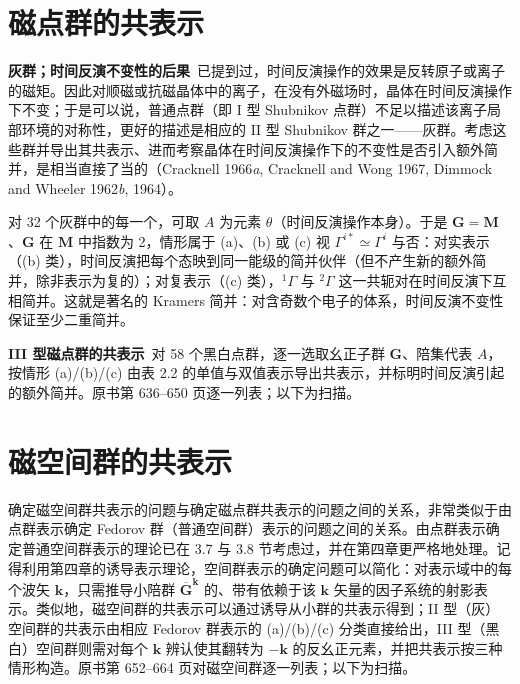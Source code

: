 \section{磁点群的共表示}

\noindent\textbf{灰群；时间反演不变性的后果}\ 已提到过，时间反演操作的效果是反转原子或离子的磁矩。因此对顺磁或抗磁晶体中的离子，在没有外磁场时，晶体在时间反演操作下不变；于是可以说，普通点群（即 I 型 Shubnikov 点群）不足以描述该离子局部环境的对称性，更好的描述是相应的 II 型 Shubnikov 群之一——灰群。考虑这些群并导出其共表示、进而考察晶体在时间反演操作下的不变性是否引入额外简并，是相当直接了当的（Cracknell 1966\textit{a}, Cracknell and Wong 1967, Dimmock and Wheeler 1962\textit{b}, 1964）。

对 32 个灰群中的每一个，可取 $A$ 为元素 $\theta$（时间反演操作本身）。于是 $\mathbf{G} = \mathbf{M}$、$\mathbf{G}$ 在 $\mathbf{M}$ 中指数为 2，情形属于 (a)、(b) 或 (c) 视 $\Gamma^{i*} \simeq \Gamma^{i}$ 与否：对实表示（(b) 类），时间反演把每个态映到同一能级的简并伙伴（但不产生新的额外简并，除非表示为复的）；对复表示（(c) 类），${}^{1}\Gamma$ 与 ${}^{2}\Gamma$ 这一共轭对在时间反演下互相简并。这就是著名的 Kramers 简并：对含奇数个电子的体系，时间反演不变性保证至少二重简并。

\noindent\textbf{III 型磁点群的共表示}\ 对 58 个黑白点群，逐一选取幺正子群 $\mathbf{G}$、陪集代表 $A$，按情形 (a)/(b)/(c) 由表 2.2 的单值与双值表示导出共表示，并标明时间反演引起的额外简并。原书第 636--650 页逐一列表；以下为扫描。



\section{磁空间群的共表示}

确定磁空间群共表示的问题与确定磁点群共表示的问题之间的关系，非常类似于由点群表示确定 Fedorov 群（普通空间群）表示的问题之间的关系。由点群表示确定普通空间群表示的理论已在 3.7 与 3.8 节考虑过，并在第四章更严格地处理。记得利用第四章的诱导表示理论，空间群表示的确定问题可以简化：对表示域中的每个波矢 $\mathbf{k}$，只需推导小陪群 $\overline{\mathbf{G}}^{\mathbf{k}}$ 的、带有依赖于该 $\mathbf{k}$ 矢量的因子系统的射影表示。类似地，磁空间群的共表示可以通过诱导从小群的共表示得到；II 型（灰）空间群的共表示由相应 Fedorov 群表示的 (a)/(b)/(c) 分类直接给出，III 型（黑白）空间群则需对每个 $\mathbf{k}$ 辨认使其翻转为 $-\mathbf{k}$ 的反幺正元素，并把共表示按三种情形构造。原书第 652--664 页对磁空间群逐一列表；以下为扫描。

